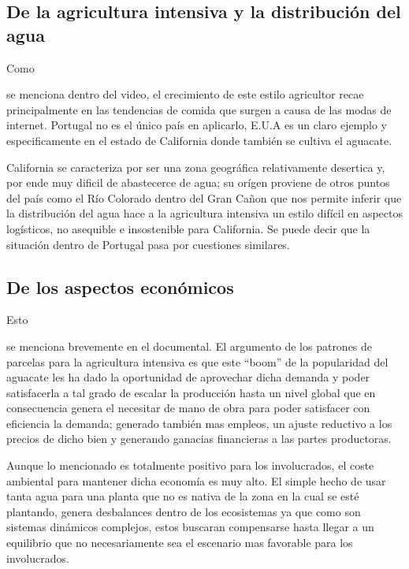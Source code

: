 \documentclass[stu, 12pt, letterpaper, donotrepeattitle, floatsintext, natbib]{apa7}
\begin{document}
\subsection{De la agricultura intensiva y la distribución del agua}  
Como \begin{justifying}
    se menciona dentro del video, el crecimiento de este estilo agricultor recae principalmente en las tendencias de comida que surgen a causa de las modas de internet. Portugal no es el único país en aplicarlo, E.U.A es un claro ejemplo
    y especificamente en el estado de California donde también se cultiva el aguacate. \par 
    \vspace{\baselineskip}
    California se caracteriza por ser una zona geográfica relativamente desertica y, por ende muy dificil de abastecerce de agua; su orígen
    proviene de otros puntos del país como el Río Colorado dentro del Gran Cañon \citep{california-department-of-water-resources-no-date} que nos permite inferir que la distribución del agua hace a la agricultura intensiva un estilo difícil en aspectos logísticos,
    no asequible e insostenible para California. Se puede decir que la situación dentro de Portugal pasa por cuestiones similares.\par
    \vspace{\baselineskip}
\end{justifying}
\subsection{De los aspectos económicos}
Esto \begin{justifying}
    se menciona brevemente en el documental. El argumento de los patrones de parcelas para la agricultura intensiva es que este ``boom'' de la popularidad del aguacate les ha dado la oportunidad de aprovechar dicha demanda y poder satisfacerla a tal grado
    de escalar la producción hasta un nivel global que en consecuencia genera el necesitar de mano de obra para poder satisfacer con eficiencia la demanda; generado también mas empleos, un ajuste reductivo a los precios de dicho bien y generando ganacias financieras
    a las partes productoras.\par
    \vspace{\baselineskip}
    Aunque lo mencionado es totalmente positivo para los involucrados, el coste ambiental para mantener dicha economía es muy alto. El simple hecho de usar tanta agua para una planta que no es nativa de la zona en la cual se esté plantando, genera desbalances
    dentro de los ecosistemas \citep{vega-2020} ya que como son sistemas dinámicos complejos, estos buscaran compensarse hasta llegar a un equilibrio \citep{maayan-2017} que no necesariamente sea el escenario mas favorable para los involucrados.\par
    \vspace{\baselineskip}
\end{justifying}
\end{document}
